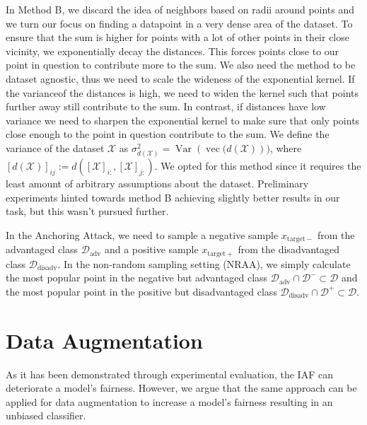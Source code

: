 In Method B, we discard the idea of neighbors based on radii around points and we turn our focus on finding a datapoint in a very dense area of the dataset. To ensure that the sum is higher for points with a lot of other points in their close vicinity, we exponentially decay the distances. This forces points close to our point in question to contribute more to the sum. We also need the method to be dataset agnostic, thus we need to scale the wideness of the exponential kernel. If the variance\footnotemark of the distances is high, we need to widen the kernel such that points further away still contribute to the sum. In contrast, if distances have low variance we need to sharpen the exponential kernel to make sure that only points close enough to the point in question contribute to the sum. We define the variance of the dataset $\mathcal{X}$ as $\sigma_{d(\mathcal{X})}^2=\operatorname{Var}\left(\operatorname{vec}(d(\mathcal{X})\right))$, where  $\left[d(\mathcal{X})\right]_{i j}:=d\left(\left[\mathcal{X}\right]_{i :}, \left[\mathcal{X}\right]_{j :}\right)$. We opted for this method since it requires the least amount of arbitrary assumptions about the dataset. Preliminary experiments hinted towards method B achieving slightly better results in our task, but this wasn't pursued further.

In the Anchoring Attack, we need to sample a negative sample $x_{\mathrm{target-}}$ from the advantaged class $\mathcal{D}_{\mathrm{adv}}$ and a positive sample $x_{\mathrm{target+}}$ from the disadvantaged class $\mathcal{D}_{\mathrm{disadv}}$. In the non-random sampling setting (NRAA), we simply calculate the most popular point in the negative but advantaged class $\mathcal{D}_{\mathrm{adv}}\cap\mathcal{D}^-\subset \mathcal{D}$ and the most popular point in the positive but disadvantaged class $\mathcal{D}_{\mathrm{disadv}}\cap\mathcal{D}^+\subset \mathcal{D}$.


\section{Data Augmentation}
\label{appendix:data_augmetation}
As it has been demonstrated through experimental evaluation, the IAF can deteriorate a model's fairness. However, we argue that the same approach can be applied for data augmentation to increase a model's fairness resulting in an unbiased classifier.

